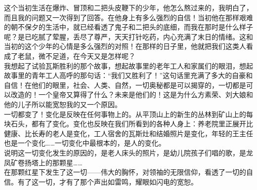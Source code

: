 这个当初生活在爆炸、冒顶和二把头皮鞭下的少年，他怎么熬过来的，我明白了，而且我的问题又一次得到了回答。在他身上有多么强烈的自信！当初他在那样艰难的朝不保夕的生活中，就已经看透了鬼子和二把头的底细，而我在那时是什么样子呢？是已吃腻了荤腥，丢尽了尊严，天天打针吃药，内心充满了末日的情绪。这和当初的这个少年的心情是多么强烈的对照！在那样的日子里，他就把我们这类人看成了老鼠，微不足道，在今天又是怎样呢？\\

我想起了试验瓦斯胜利的那个故事，想起故事里的老年工人和家属们的眼泪，想起故事里的青年工人高呼的那句话：“我们又胜利了！”这句话里充满了多大的自豪和自信！在他们的眼里，社会、人类、自然，一切奥秘都是可以揭穿的，一切都是可以改造的！一个皇帝又算得了什么？未来是他们的！这是为什么方素荣、刘大娘和他的儿子所以能宽恕我的又一个原因。\\

一切都变了！变化是反映在任何事物上的。从平顶山上的新生的丛林到矿山上的每块石头，都有了变化。变化也反映在我们所看到的各种人身上：养老院里正展开比健康、比长寿的老人是变化，工人宿舍的瓦斯灶和结婚照片是变化，年轻的王主任也是一个变化……一切变化中最根本的，是人的变化。\\

说明这一切变化发生的原因的，是老人床头的照片，是幼儿院孩子们唱的歌，是龙凤矿卷扬塔上的那颗星……\\

在那颗红星下发生了这一切——伟大的胸怀，对领袖的无限信仰，看透了一切的自信。有了这一切，才有了那个声出如雷鸣，耀眼如闪电的宽恕。\\